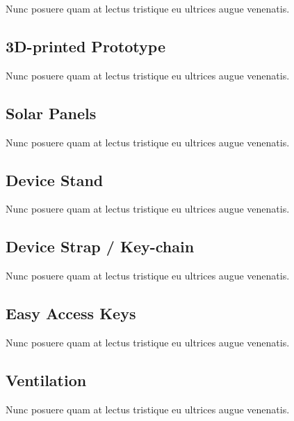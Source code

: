 Nunc posuere quam at lectus tristique eu ultrices augue venenatis.

\subsection{3D-printed Prototype}

Nunc posuere quam at lectus tristique eu ultrices augue venenatis.

\subsection{Solar Panels}

Nunc posuere quam at lectus tristique eu ultrices augue venenatis.

\subsection{Device Stand}

Nunc posuere quam at lectus tristique eu ultrices augue venenatis.

\subsection{Device Strap / Key-chain}

Nunc posuere quam at lectus tristique eu ultrices augue venenatis.

\subsection{Easy Access Keys}

Nunc posuere quam at lectus tristique eu ultrices augue venenatis.

\subsection{Ventilation}

Nunc posuere quam at lectus tristique eu ultrices augue venenatis.

